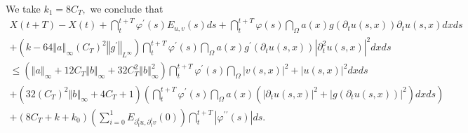 \documentclass[11pt,reqno]{amsart}
\theoremstyle{plain}
\numberwithin{equation}{section}
\numberwithin{equation}{section}
\begin{document}
We take $k_{1}=8C_{T},$ we conclude that%
\begin{equation}
\begin{array}{l}
X\left( t+T\right) -X\left( t\right) +\dint_{t}^{t+T}\varphi ^{\prime
}\left( s\right) E_{u,v}\left( s\right) ds+\dint_{t}^{t+T}\varphi \left(
s\right) \dint_{\Omega }a\left( x\right) g\left( \partial _{t}u\left(
s,x\right) \right) \partial _{t}u\left( s,x\right) dxds \\ 
+\left( k-64\left\Vert a\right\Vert _{\infty }\left( C_{T}\right)
^{2}\left\Vert g^{\prime }\right\Vert _{L^{\infty }}\right)
\dint_{t}^{t+T}\varphi ^{\prime }\left( s\right) \dint_{\Omega }a\left(
x\right) g^{\prime }\left( \partial _{t}u\left( s,x\right) \right)
\left\vert \partial _{t}^{2}u\left( s,x\right) \right\vert ^{2}dxds \\ 
\leq \left( \left\Vert a\right\Vert _{\infty }+12C_{T}\left\Vert
b\right\Vert _{\infty }+32C_{T}^{2}\left\Vert b\right\Vert _{\infty
}^{2}\right) \dint_{t}^{t+T}\varphi ^{\prime }\left( s\right) \dint_{\Omega
}\left\vert v\left( s,x\right) \right\vert ^{2}+\left\vert u\left(
s,x\right) \right\vert ^{2}dxds \\ 
+\left( 32\left( C_{T}\right) ^{2}\left\Vert b\right\Vert _{\infty
}+4C_{T}+1\right) \left( \dint_{t}^{t+T}\varphi ^{\prime }\left( s\right)
\dint_{\Omega }a\left( x\right) \left( \left\vert \partial _{t}u\left(
s,x\right) \right\vert ^{2}+\left\vert g\left( \partial _{t}u\left(
s,x\right) \right) \right\vert ^{2}\right) dxds\right) \\ 
+\left( 8C_{T}+k+k_{0}\right) \left( \sum_{i=0}^{1}E_{\partial
_{t}^{i}u,\partial _{t}^{i}v}\left( 0\right) \right)
\dint_{t}^{t+T}\left\vert \varphi ^{\prime \prime }\left( s\right)
\right\vert ds.%
\end{array}
\label{proof theorem Xt prefinal estimate}
\end{equation}
\end{document}
